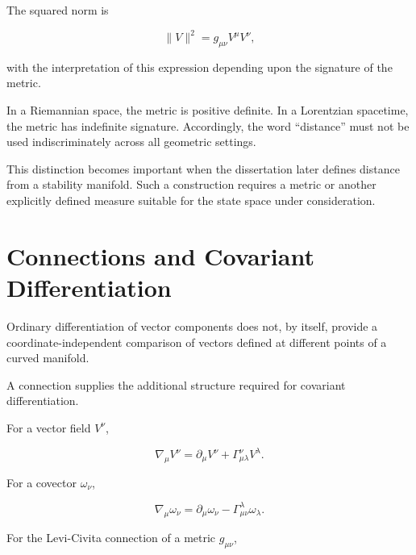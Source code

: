 \documentclass[12pt,oneside]{book}
\begin{document}
The squared norm is

\begin{equation}
    \|V\|^2
    =
    g_{\mu\nu}
    V^\mu V^\nu,
    \label{eq:vector-norm}
\end{equation}

with the interpretation of this expression depending upon the
signature of the metric.

In a Riemannian space, the metric is positive definite. In a
Lorentzian spacetime, the metric has indefinite signature.
Accordingly, the word ``distance'' must not be used
indiscriminately across all geometric settings.

This distinction becomes important when the dissertation later
defines distance from a stability manifold. Such a construction
requires a metric or another explicitly defined measure suitable
for the state space under consideration.


\section{Connections and Covariant Differentiation}
\label{sec:connections}

Ordinary differentiation of vector components does not, by
itself, provide a coordinate-independent comparison of vectors
defined at different points of a curved manifold.

A connection supplies the additional structure required for
covariant differentiation.

For a vector field \(V^\nu\),

\begin{equation}
    \nabla_\mu V^\nu
    =
    \partial_\mu V^\nu
    +
    \Gamma^\nu_{\mu\lambda}
    V^\lambda.
    \label{eq:geometry-covariant-derivative}
\end{equation}

For a covector \(\omega_\nu\),

\begin{equation}
    \nabla_\mu \omega_\nu
    =
    \partial_\mu \omega_\nu
    -
    \Gamma^\lambda_{\mu\nu}
    \omega_\lambda.
    \label{eq:covector-covariant-derivative}
\end{equation}

For the Levi-Civita connection of a metric \(g_{\mu\nu}\),
\end{document}
